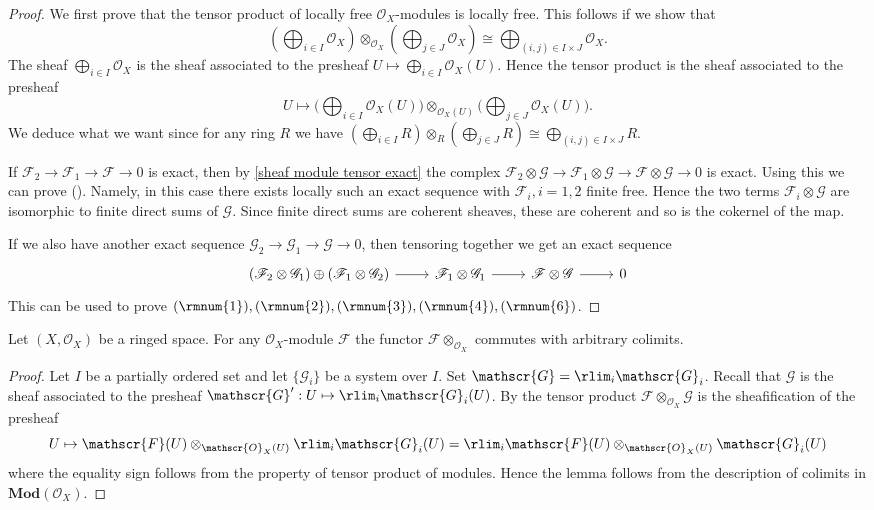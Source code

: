 \begin{proof}
We first prove that the tensor product of locally free $\mathscr{O}_X$-modules is locally free. This follows if we show that \[(\bigoplus_{i\in I}\mathscr{O}_X)\otimes_{\mathscr{O}_X}(\bigoplus_{j\in J}\mathscr{O}_X)\cong\bigoplus_{(i,j)\in I\times J}\mathscr{O}_X.\]
The sheaf $\bigoplus_{i\in I}\mathscr{O}_X$ is the sheaf associated to the presheaf $U\mapsto\bigoplus_{i\in I}\mathscr{O}_X(U)$. Hence the tensor product is the sheaf associated to the presheaf
\[U\mapsto\Big(\bigoplus_{i\in I}\mathscr{O}_X(U)\Big)\otimes_{\mathscr{O}_X(U)}\Big(\bigoplus_{j\in J}\mathscr{O}_X(U)\Big).\]
We deduce what we want since for any ring $R$ we have $(\bigoplus_{i\in I}R)\otimes_{R}(\bigoplus_{j\in J}R)\cong\bigoplus_{(i,j)\in I\times J}R$.\par
If $\mathscr{F}_2\to\mathscr{F}_1\to\mathscr{F}\to0$ is exact, then by \cref{sheaf module tensor exact} the complex $\mathscr{F}_2\otimes\mathscr{G}\to\mathscr{F}_1\otimes\mathscr{G}\to\mathscr{F}\otimes\mathscr{G}\to 0$ is exact. Using this we can prove (). Namely, in this case there exists locally such an exact sequence with $\mathscr{F}_i,i=1,2$ finite free. Hence the two terms $\mathscr{F}_i\otimes\mathscr{G}$ are isomorphic to finite direct sums of $\mathscr{G}$. Since finite direct sums are coherent sheaves, these are coherent and so is the cokernel of the map.\par
If we also have another exact sequence $\mathscr{G}_2\to\mathscr{G}_1\to\mathscr{G}\to0$, then tensoring together we get an exact sequence
\[\begin{tikzcd}
(\mathscr{F}_2\otimes\mathscr{G}_1)\oplus(\mathscr{F}_1\otimes\mathscr{G}_2)\ar[r]&\mathscr{F}_1\otimes\mathscr{G}_1\ar[r]&\mathscr{F}\otimes\mathscr{G}\ar[r]&0
\end{tikzcd}\]
This can be used to prove $(\rmnum{1}),(\rmnum{2}),(\rmnum{3}),(\rmnum{4}),(\rmnum{6})$.
\end{proof}
\begin{proposition}\label{sheaf module tensor colim}
Let $(X,\mathscr{O}_X)$ be a ringed space. For any $\mathscr{O}_X$-module $\mathscr{F}$ the functor $\mathscr{F}\otimes_{\mathscr{O}_X}$ commutes with arbitrary colimits.
\end{proposition}
\begin{proof}
Let $I$ be a partially ordered set and let $\{\mathscr{G}_i\}$ be a system over $I$. Set $\mathscr{G}=\rlim_i\mathscr{G}_i$. Recall that $\mathscr{G}$ is the sheaf associated to the presheaf $\mathscr{G}':U\mapsto\rlim_i\mathscr{G}_i(U)$. By  the tensor product $\mathscr{F}\otimes_{\mathscr{O}_X}\mathscr{G}$ is the sheafification of the presheaf
\[U\mapsto\mathscr{F}(U)\otimes_{\mathscr{O}_X(U)}\rlim_i\mathscr{G}_i(U)=\rlim_i\mathscr{F}(U)\otimes_{\mathscr{O}_X(U)}\mathscr{G}_i(U)\]
where the equality sign follows from the property of tensor product of modules. Hence the lemma follows from the description of colimits in $\mathbf{Mod}(\mathscr{O}_X)$.
\end{proof}
